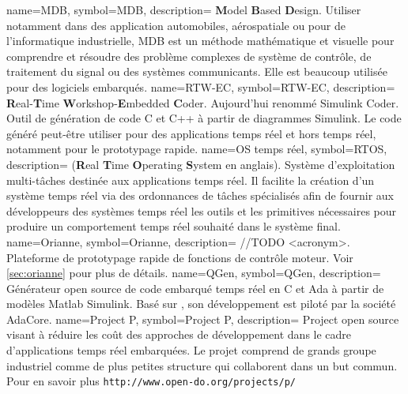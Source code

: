   {
	name=MDB,
	symbol=MDB,
	description=
	{
	  {\bf M}odel {\bf B}ased {\bf D}esign. Utiliser notamment dans des application
	  automobiles, aérospatiale ou pour de l'informatique industrielle, MDB est un
	  méthode mathématique et visuelle pour comprendre et résoudre des problème
	   complexes de système de contrôle, de traitement du signal ou des systèmes
	   communicants. Elle est beaucoup utilisée pour des logiciels embarqués.
	}
}
  {
	name=RTW-EC\up{\circledR},
	symbol=RTW-EC\up{\circledR},
	description=
	{
	  {\bf R}eal-{\bf T}ime {\bf W}orkshop-{\bf E}mbedded {\bf C}oder\up{\circledR}.
	  Aujourd'hui renommé Simulink Coder\up{\texttrademark}. Outil de génération de code
	  C et C++ à partir de diagrammes Simulink\up{\circledR}. Le code généré peut-être
	  utiliser pour des applications temps réel et hors temps réel, notamment pour le
	  prototypage rapide.
	}
}
  {
	name=OS temps réel,
	symbol=RTOS,
	description=
	{
	  ({\bf R}eal {\bf T}ime {\bf O}perating {\bf S}ystem en anglais). Système d'exploitation
	  multi-tâches destinée aux applications temps réel. Il facilite la création d'un système
	  temps réel via des ordonnances de tâches spécialisés afin de fournir aux développeurs
	  des systèmes temps réel les outils et les primitives nécessaires pour produire un
	  comportement temps réel souhaité dans le système final.
	}
}
  {
	name=Orianne,
	symbol=Orianne,
	description=
	{
	  //TODO <acronym>. Plateforme de prototypage rapide de fonctions de contrôle moteur. Voir \ref{sec:orianne} pour plus de détails.
	}
}
  {
	name=QGen,
	symbol=QGen,
	description=
	{
	  Générateur open source de code embarqué temps réel en C et Ada à partir de modèles
	  Matlab\up{\textregistered} Simulink\up{\textregistered}. Basé sur
	  , son développement est piloté par la société AdaCore.
	}
}
  {
	name=Project P,
	symbol=Project P,
	description=
	{
	  Project open source visant à réduire les coût des approches de
	  développement  dans le cadre d'applications temps réel
	  embarquées. Le projet comprend de grands groupe industriel comme de plus
	  petites structure qui collaborent dans un but commun. Pour en savoir plus
	  {\tt http://www.open-do.org/projects/p/}
	}
}

